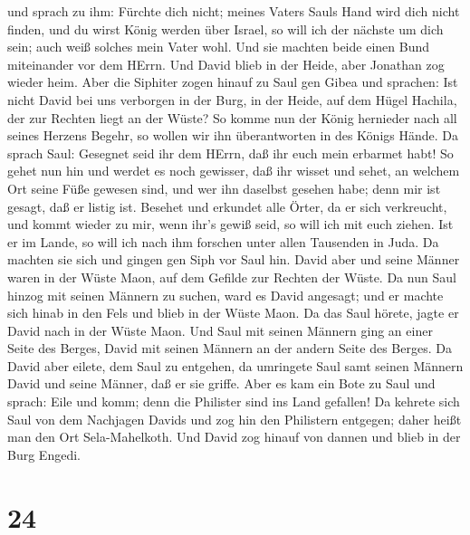  und sprach zu ihm: Fürchte dich nicht; meines Vaters Sauls
Hand wird dich nicht finden, und du wirst König werden über Israel, so
will ich der nächste um dich sein; auch weiß solches mein Vater wohl.
 Und sie machten beide einen Bund miteinander vor dem
HErrn. Und David blieb in der Heide, aber Jonathan zog wieder heim.
 Aber die Siphiter zogen hinauf zu Saul gen Gibea und
sprachen: Ist nicht David bei uns verborgen in der Burg, in der Heide,
auf dem Hügel Hachila, der zur Rechten liegt an der Wüste? 
So komme nun der König hernieder nach all seines Herzens Begehr, so
wollen wir ihn überantworten in des Königs Hände.  Da
sprach Saul: Gesegnet seid ihr dem HErrn, daß ihr euch mein erbarmet
habt!  So gehet nun hin und werdet es noch gewisser, daß
ihr wisset und sehet, an welchem Ort seine Füße gewesen sind, und wer
ihn daselbst gesehen habe; denn mir ist gesagt, daß er listig ist.
 Besehet und erkundet alle Örter, da er sich verkreucht,
und kommt wieder zu mir, wenn ihr's gewiß seid, so will ich mit euch
ziehen. Ist er im Lande, so will ich nach ihm forschen unter allen
Tausenden in Juda.  Da machten sie sich und gingen gen Siph
vor Saul hin. David aber und seine Männer waren in der Wüste Maon, auf
dem Gefilde zur Rechten der Wüste.  Da nun Saul hinzog mit
seinen Männern zu suchen, ward es David angesagt; und er machte sich
hinab in den Fels und blieb in der Wüste Maon. Da das Saul hörete, jagte
er David nach in der Wüste Maon.  Und Saul mit seinen
Männern ging an einer Seite des Berges, David mit seinen Männern an der
andern Seite des Berges. Da David aber eilete, dem Saul zu entgehen, da
umringete Saul samt seinen Männern David und seine Männer, daß er sie
griffe.  Aber es kam ein Bote zu Saul und sprach: Eile und
komm; denn die Philister sind ins Land gefallen!  Da
kehrete sich Saul von dem Nachjagen Davids und zog hin den Philistern
entgegen; daher heißt man den Ort Sela-Mahelkoth.  Und
David zog hinauf von dannen und blieb in der Burg Engedi.

\hypertarget{section-23}{%
\section{24}\label{section-23}}

